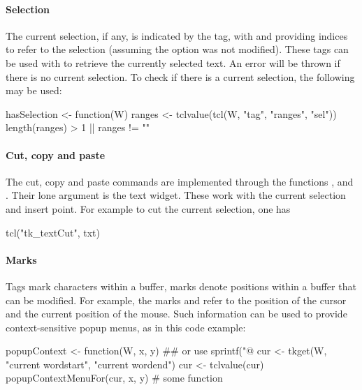 \paragraph{Selection}
The current selection, if any, is indicated by the  tag,
with  and  providing indices to refer
to the selection (assuming the option  was not
modified). These tags can be used with  to retrieve the
currently selected text. An error will be thrown if there is no
current selection. To check if there is a current selection, the following may be used:
\begin{Schunk}
\begin{Sinput}
 hasSelection <- function(W) {
   ranges <- tclvalue(tcl(W, "tag", "ranges", "sel"))
   length(ranges) > 1 || ranges != ""
 }
\end{Sinput}
\end{Schunk}

\paragraph{Cut, copy and paste} 
The cut, copy and paste commands are implemented through the \Tk\/ functions
,  and
. Their lone argument is the text widget. These
work with the current selection and insert point. For example to cut
the current selection, one has
\begin{Schunk}
\begin{Sinput}
 tcl("tk_textCut", txt)
\end{Sinput}
\end{Schunk}

\paragraph{Marks}
Tags mark characters within a buffer, marks denote positions within a
buffer that can be modified. For example, the marks  and
 refer to the position of the cursor and the current
position of the mouse. Such information can be used to provide
context-sensitive popup menus, as in this code example:
\begin{Schunk}
\begin{Sinput}
 popupContext <- function(W, x, y) {
   ## or use sprintf("@%
   cur <- tkget(W, "current wordstart", "current wordend") 
   cur <- tclvalue(cur)
   popupContextMenuFor(cur, x, y)        # some function
 }
\end{Sinput}
\end{Schunk}

